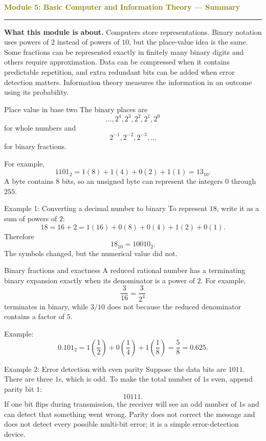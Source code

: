 \documentclass[11pt]{article}
\newcommand{\summaryhead}[2]{%
  \clearpage
  {\Large\bfseries\textcolor{olive}{Module #1: #2 — Summary}}\par
  \vspace{2pt}\textcolor{gold}{\rule{\linewidth}{1.2pt}}\par\smallskip
}
\begin{document}
\summaryhead{5}{Basic Computer and Information Theory}

\textbf{What this module is about.} Computers store representations. Binary notation uses powers of \(2\) instead of powers of \(10\), but the place-value idea is the same. Some fractions can be represented exactly in finitely many binary digits and others require approximation. Data can be compressed when it contains predictable repetition, and extra redundant bits can be added when error detection matters. Information theory measures the information in an outcome using its probability.

\begin{keybox}{Place value in base two}
The binary places are
\[
\ldots,2^4,2^3,2^2,2^1,2^0
\]
for whole numbers and
\[
2^{-1},2^{-2},2^{-3},\ldots
\]
for binary fractions.

For example,
\[
1101_2=1(8)+1(4)+0(2)+1(1)=13_{10}.
\]
A byte contains \(8\) bits, so an unsigned byte can represent the integers \(0\) through \(255\).
\end{keybox}

\begin{examplebox}{Example 1: Converting a decimal number to binary}
To represent \(18\), write it as a sum of powers of \(2\):
\[
18=16+2=1(16)+0(8)+0(4)+1(2)+0(1).
\]
Therefore
\[
18_{10}=10010_2.
\]
The symbols changed, but the numerical value did not.
\end{examplebox}

\begin{keybox}{Binary fractions and exactness}
A reduced rational number has a terminating binary expansion exactly when its denominator is a power of \(2\). For example,
\[
\frac{3}{16}=\frac{3}{2^4}
\]
terminates in binary, while \(3/10\) does not because the reduced denominator contains a factor of \(5\).

Example:
\[
0.101_2=1\left(\frac12\right)+0\left(\frac14\right)+1\left(\frac18\right)=\frac58=0.625.
\]
\end{keybox}

\begin{examplebox}{Example 2: Error detection with even parity}
Suppose the data bits are \(1011\). There are three \(1\)s, which is odd. To make the total number of \(1\)s even, append parity bit \(1\):
\[
1011\boxed{1}.
\]
If one bit flips during transmission, the receiver will see an odd number of \(1\)s and can detect that something went wrong. Parity does not correct the message and does not detect every possible multi-bit error; it is a simple error-detection device.
\end{examplebox}
\end{document}
